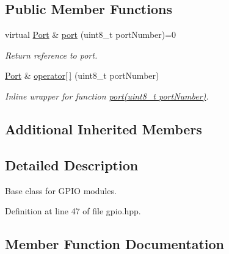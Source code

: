\subsection*{Public Member Functions}
\begin{DoxyCompactItemize}
\item 
\hypertarget{classyahal_1_1mcu_1_1_gpio_ae479c2a3403911b60310bf0c57594dcd}{}virtual \hyperlink{classyahal_1_1mcu_1_1_gpio_1_1_port}{Port} \& \hyperlink{classyahal_1_1mcu_1_1_gpio_ae479c2a3403911b60310bf0c57594dcd}{port} (uint8\+\_\+t port\+Number)=0\label{classyahal_1_1mcu_1_1_gpio_ae479c2a3403911b60310bf0c57594dcd}

\begin{DoxyCompactList}\small\item\em Return reference to port. \end{DoxyCompactList}\item 
\hyperlink{classyahal_1_1mcu_1_1_gpio_1_1_port}{Port} \& \hyperlink{classyahal_1_1mcu_1_1_gpio_add77eaf55d6aad1987e223edf85d4c56}{operator\mbox{[}$\,$\mbox{]}} (uint8\+\_\+t port\+Number)
\begin{DoxyCompactList}\small\item\em Inline wrapper for function \hyperlink{classyahal_1_1mcu_1_1_gpio_ae479c2a3403911b60310bf0c57594dcd}{port(uint8\+\_\+t port\+Number)}. \end{DoxyCompactList}\end{DoxyCompactItemize}
\subsection*{Additional Inherited Members}


\subsection{Detailed Description}
Base class for G\+P\+I\+O modules. 

Definition at line 47 of file gpio.\+hpp.



\subsection{Member Function Documentation}
\hypertarget{classyahal_1_1mcu_1_1_gpio_add77eaf55d6aad1987e223edf85d4c56}{}
